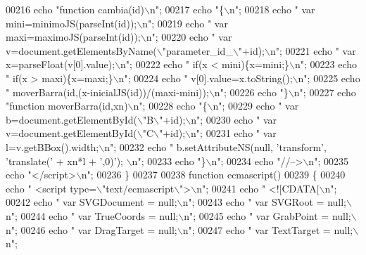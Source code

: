 \begin{DoxyCode}
{{00216     echo \textcolor{stringliteral}{"function cambia(id)\(\backslash\)n"};
00217     echo \textcolor{stringliteral}{"\{\(\backslash\)n"};
00218     echo \textcolor{stringliteral}{"  var mini=minimoJS(parseInt(id));\(\backslash\)n"};
00219     echo \textcolor{stringliteral}{"  var maxi=maximoJS(parseInt(id));\(\backslash\)n"};
00220     echo \textcolor{stringliteral}{"  var v=document.getElementsByName(\(\backslash\)"parameter\_id\_\(\backslash\)"+id);\(\backslash\)n"};
00221     echo \textcolor{stringliteral}{"  var x=parseFloat(v[0].value);\(\backslash\)n"};
00222     echo \textcolor{stringliteral}{"  if(x < mini)\{x=mini;\}\(\backslash\)n"};
00223     echo \textcolor{stringliteral}{"  if(x > maxi)\{x=maxi;\}\(\backslash\)n"};
00224     echo \textcolor{stringliteral}{"  v[0].value=x.toString();\(\backslash\)n"};
00225     echo \textcolor{stringliteral}{"  moverBarra(id,(x-inicialJS(id))/(maxi-mini));\(\backslash\)n"};
00226     echo \textcolor{stringliteral}{"\}\(\backslash\)n"};
00227     echo \textcolor{stringliteral}{"function moverBarra(id,xn)\(\backslash\)n"};
00228     echo \textcolor{stringliteral}{"\{\(\backslash\)n"};
00229     echo \textcolor{stringliteral}{"  var b=document.getElementById(\(\backslash\)"B\(\backslash\)"+id);\(\backslash\)n"};
00230     echo \textcolor{stringliteral}{"  var v=document.getElementById(\(\backslash\)"C\(\backslash\)"+id);\(\backslash\)n"};
00231     echo \textcolor{stringliteral}{"  var l=v.getBBox().width;\(\backslash\)n"};
00232     echo \textcolor{stringliteral}{"  b.setAttributeNS(null, 'transform', 'translate(' + xn*l  + ',0)');
      \(\backslash\)n"};
00233     echo \textcolor{stringliteral}{"\}\(\backslash\)n"};
00234     echo \textcolor{stringliteral}{"//-->\(\backslash\)n"};
00235     echo \textcolor{stringliteral}{"</script>\(\backslash\)n"};
00236   \}
00237 
00238   \textcolor{keyword}{function} ecmascript()
00239   \{
00240     echo \textcolor{stringliteral}{"    <script type=\(\backslash\)"text/ecmascript\(\backslash\)">\(\backslash\)n"};
00241     echo \textcolor{stringliteral}{"   <![CDATA[\(\backslash\)n"};
00242     echo \textcolor{stringliteral}{"        var SVGDocument = null;\(\backslash\)n"};
00243     echo \textcolor{stringliteral}{"        var SVGRoot = null;\(\backslash\)n"};
00244     echo \textcolor{stringliteral}{"        var TrueCoords = null;\(\backslash\)n"};
00245     echo \textcolor{stringliteral}{"        var GrabPoint = null;\(\backslash\)n"};
00246     echo \textcolor{stringliteral}{"        var DragTarget = null;\(\backslash\)n"};
00247     echo \textcolor{stringliteral}{"        var TextTarget = null;\(\backslash\)n"};
}}
\end{DoxyCode}
